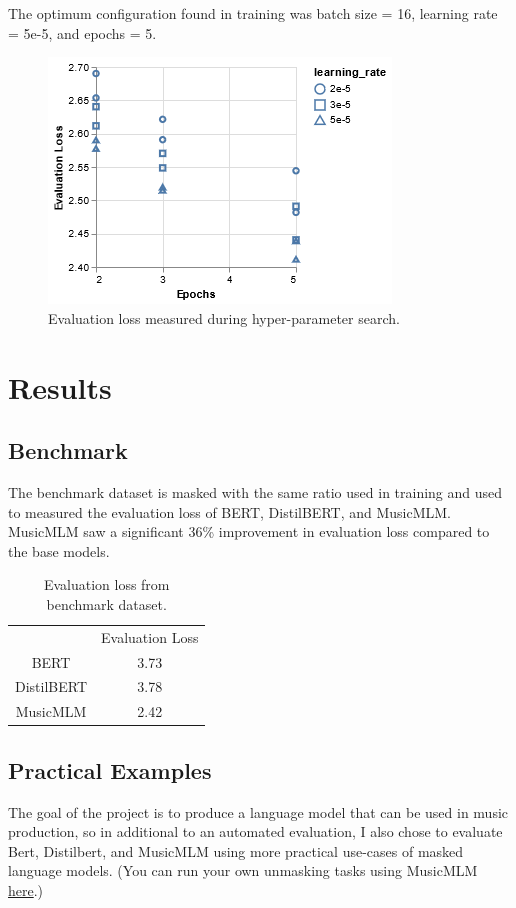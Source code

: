 \documentclass[11pt,a4paper]{article}
\begin{document}
The optimum configuration found in training was batch size = 16, learning rate = 5e-5, and epochs = 5.

\begin{figure}
\centering
\includegraphics[scale=0.6]{visualization.png}
\caption{Evaluation loss measured during hyper-parameter search.}
\label{figure:1}
\end{figure}

\section{Results}

\subsection{Benchmark}

The benchmark dataset is masked with the same ratio used in training and used to measured the evaluation loss of BERT, DistilBERT, and MusicMLM. MusicMLM saw a significant 36\% improvement in evaluation loss compared to the base models.

\begin{table}[h!]
\centering
\begin{tabular}{ c c }
 & Evaluation Loss \\ 
 BERT & 3.73 \\
 DistilBERT & 3.78 \\
 MusicMLM & 2.42
\end{tabular}
\caption{Evaluation loss from benchmark dataset.}
\label{table:1}
\end{table}

\subsection{Practical Examples}

The goal of the project is to produce a language model that can be used in music production, so in additional to an automated evaluation, I also chose to evaluate Bert, Distilbert, and MusicMLM using more practical use-cases of masked language models. (You can run your own unmasking tasks using MusicMLM \href{https://music-mlm.jacksonargo.com}{here}.)
\end{document}
